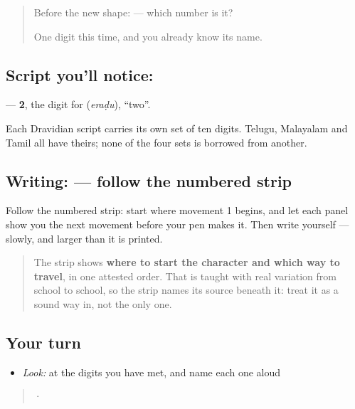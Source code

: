 \label{lesson:KA-S141-digit-two}



\begin{quote}
Before the new shape: \textbf{} — which number is it?

One digit this time, and you already know its name.
\end{quote}

\subsection*{Script you'll notice: }
\textbf{} — \textbf{2}, the digit for \textbf{} (\emph{eraḍu}), \textquotedblleft{}two\textquotedblright{}.

Each Dravidian script carries its own set of ten digits. Telugu, Malayalam and Tamil all have theirs; none of the four sets is borrowed from another.

\subsection*{Writing:  — follow the numbered strip}

Follow the numbered strip: start where movement 1 begins, and let each panel show you the next movement before your pen makes it. Then write  yourself — slowly, and larger than it is printed.

\begin{quote}
The strip shows \textbf{where to start the character and which way to travel}, in one attested order. That is taught with real variation from school to school, so the strip names its source beneath it: treat it as a sound way in, not the only one.
\end{quote}

\subsection*{Your turn}
\begin{itemize}
\raggedright
  \item \emph{Look:} at the digits you have met, and name each one aloud
\end{itemize}

\begin{quote}
  ·  
\end{quote}

